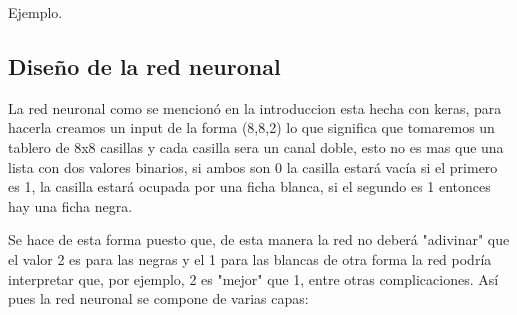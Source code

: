 \documentclass[conference]{IEEEtran}
\begin{document}
Ejemplo.

\subsection{Diseño de la red neuronal}
La red neuronal como se mencionó en la introduccion esta hecha con keras, para hacerla 
creamos un input de la forma (8,8,2) lo que significa que tomaremos un tablero de 8x8 casillas y cada casilla
sera un canal doble, esto no es mas que una lista con dos valores binarios, si ambos son 0 la casilla estará vacía
si el primero es 1, la casilla estará ocupada por una ficha blanca, si el segundo es 1 entonces hay una ficha negra.


Se hace de esta forma puesto que, de esta manera la red no deberá "adivinar" que el valor 2 es para las negras y el 1 para las blancas
de otra forma la red podría interpretar que, por ejemplo, 2 es "mejor" que 1, entre otras complicaciones.
Así pues la red neuronal se compone de varias capas:
\end{document}
